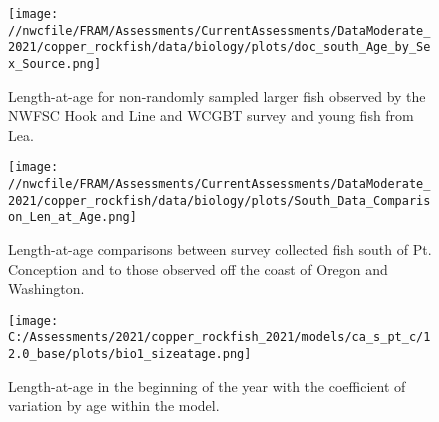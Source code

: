 \documentclass[11pt,
  english,
  a4paper,
]{article}
\begin{document}
\tagmcend\tagstructend


\begin{figure}
\centering
\texttt{[image: //nwcfile/FRAM/Assessments/CurrentAssessments/DataModerate\_2021/copper\_rockfish/data/biology/plots/doc\_south\_Age\_by\_Sex\_Source.png]}
\caption{Length-at-age for non-randomly sampled larger fish observed by the NWFSC Hook and Line and WCGBT survey and young fish from Lea.\label{fig:south-len-at-age-data}}
\end{figure}

\tagmcend\tagstructend


\begin{figure}
\centering
\texttt{[image: //nwcfile/FRAM/Assessments/CurrentAssessments/DataModerate\_2021/copper\_rockfish/data/biology/plots/South\_Data\_Comparison\_Len\_at\_Age.png]}
\caption{Length-at-age comparisons between survey collected fish south of Pt. Conception and to those observed off the coast of Oregon and Washington.\label{fig:len-at-age-comp}}
\end{figure}

\tagmcend\tagstructend

\newpage


\begin{figure}
\centering
\texttt{[image: C:/Assessments/2021/copper\_rockfish\_2021/models/ca\_s\_pt\_c/12.0\_base/plots/bio1\_sizeatage.png]}
\caption{Length-at-age in the beginning of the year with the coefficient of variation by age within the model.\label{fig:len-age-ss}}
\end{figure}

\tagmcend\tagstructend

\end{document}
